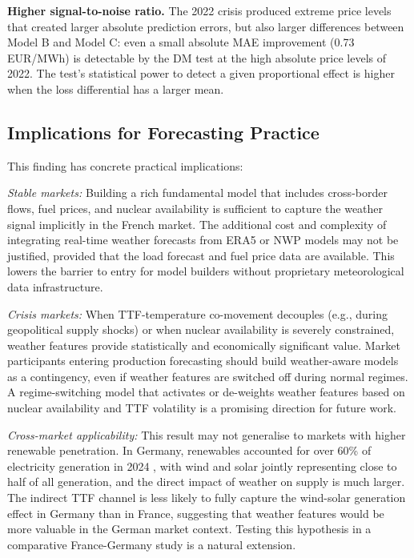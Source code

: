 \textbf{Higher signal-to-noise ratio.} The 2022 crisis produced extreme price
levels that created larger absolute prediction errors, but also larger
differences between Model B and Model C: even a small absolute MAE improvement
(0.73 EUR/MWh) is detectable by the DM test at the high absolute price levels
of 2022. The test's statistical power to detect a given proportional effect
is higher when the loss differential has a larger mean.

\subsection{Implications for Forecasting Practice}

This finding has concrete practical implications:

\textit{Stable markets:} Building a rich fundamental model that includes
cross-border flows, fuel prices, and nuclear availability is sufficient to
capture the weather signal implicitly in the French market. The additional cost
and complexity of integrating real-time weather forecasts from ERA5 or NWP
models may not be justified, provided that the load forecast and fuel price
data are available. This lowers the barrier to entry for model builders
without proprietary meteorological data infrastructure.

\textit{Crisis markets:} When TTF-temperature co-movement decouples (e.g.,
during geopolitical supply shocks) or when nuclear availability is severely
constrained, weather features provide statistically and economically significant
value. Market participants entering production forecasting should build
weather-aware models as a contingency, even if weather features are switched off
during normal regimes. A regime-switching model that activates or de-weights
weather features based on nuclear availability and TTF volatility is a
promising direction for future work.

\textit{Cross-market applicability:} This result may not generalise to markets
with higher renewable penetration. In Germany, renewables accounted for over 60\% of electricity generation in 2024
\citep{fraunhofer2025}, with wind and solar jointly representing close to half of
all generation, and the direct impact of weather on supply is much larger.
The indirect TTF channel is less likely to fully capture the wind-solar
generation effect in Germany than in France, suggesting that weather features
would be more valuable in the German market context. Testing this hypothesis
in a comparative France-Germany study is a natural extension.

